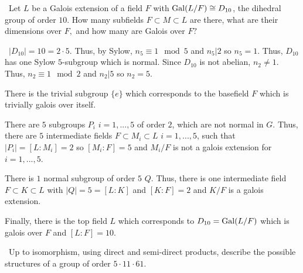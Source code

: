 \documentclass[12pt]{Qual}
\begin{document}
\begin{problem} $\,$
Let $L$ be a Galois extension of a field $F$ with $\text{Gal}(L/F)\cong D_{10}$, the dihedral group of order $10$. How many subfields $F\subset M\subset L$ are there, what are their dimensions over $F,$ and how many are Galois over $F?$
\end{problem}


\begin{solution}$\,$
$|D_{10}|=10=2\cdot 5$. Thus, by Sylow, $n_5\equiv 1\mod 5$ and $n_5|2$ so $n_5=1$. Thus, $D_{10}$ has one Sylow $5$-subgroup which is normal. Since $D_{10}$ is not abelian, $n_2\not=1$. Thus, $n_2\equiv 1\mod 2$ and $n_2|5$ so $n_2=5$.

There is the trivial subgroup $\{e\}$ which corresponds to the basefield $F$ which is trivially galois over itself.

There are $5$ subgroups $P_i$ $i=1,...,5$ of order $2$, which are not normal in $G$. Thus, there are $5$ intermediate fields $F\subset M_i\subset L$ $i=1,...,5$, such that $|P_i|=[L:M_i]=2$ so $[M_i:F]=5$ and $M_i/F$ is not a galois extension for $i=1,...,5$.

There is $1$ normal subgroup of order $5$ $Q$. Thus, there is one intermediate field $F\subset K\subset L$ with $|Q|=5=[L:K]$ and $[K:F]=2$ and $K/F$ is a galois extension.

Finally, there is the top field $L$ which corresponds to $D_{10}=\text{Gal}(L/F)$ which is galois over $F$ and $[L:F]=10$.
\end{solution}
\newpage


\begin{problem} $\,$
Up to isomorphism, using direct and semi-direct products, describe the possible structures of a group of order $5\cdot 11\cdot 61$.
\end{problem}
\end{document}
